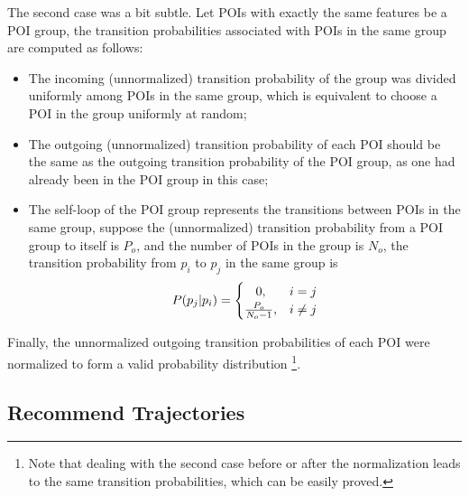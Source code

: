 The second case was a bit subtle.
Let POIs with exactly the same features be a POI group,
the transition probabilities associated with POIs in the same group are computed as follows:
\begin{itemize}
\item The incoming (unnormalized) transition probability of the group was divided uniformly among POIs 
      in the same group, which is equivalent to choose a POI in the group uniformly at random;
\item The outgoing (unnormalized) transition probability of each POI should be the same as the 
      outgoing transition probability of the POI group, as one had already been in the POI group in this case;
\item The self-loop of the POI group represents the transitions between POIs in the same group,
      suppose the (unnormalized) transition probability from a POI group to itself is $P_o$,
      and the number of POIs in the group is $N_o$,
      the transition probability from $p_i$ to $p_j$ in the same group is
      \begin{displaymath}
          P(p_j | p_i) = 
          \begin{cases}
              \hfill 0, \hfill & i = j \\
              \hfill \frac{P_o}{N_o - 1}, \hfill & i \ne j \\
          \end{cases}
      \end{displaymath}
\end{itemize}
Finally, the unnormalized outgoing transition probabilities of each POI were normalized to form 
a valid probability distribution
\footnote{Note that dealing with the second case before or after the normalization leads to 
the same transition probabilities, which can be easily proved.}.


\subsection{Recommend Trajectories}
\label{method:recommend}

